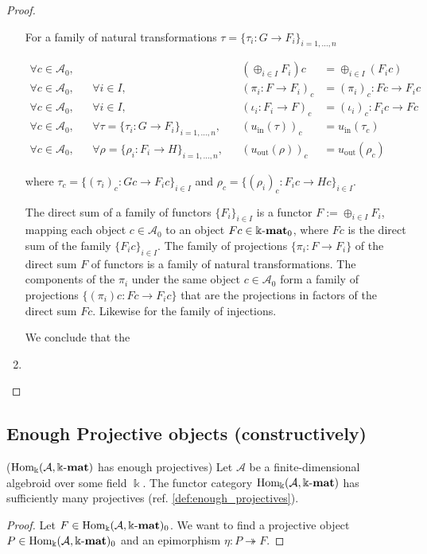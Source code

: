\begin{proof}
\begin{enumerate}
\begin{subproof}[Proof of (ii)]
For a family of natural transformations $\tau = \{ \tau_{i} : G \rightarrow F_{i} \}_{i = 1,\dots,n}$

\begin{align*}
\forall c \in \mathcal{A}_{0},&& &&  (\oplus_{i \in I} F_{i}) c &= \oplus_{i \in I} (F_{i} c) \\
\forall c \in \mathcal{A}_{0},&& \forall i \in I,&& (\pi_{i} : F \rightarrow F_{i})_{c} &= (\pi_{i})_{c} : Fc \rightarrow F_{i} c \\
\forall c \in \mathcal{A}_{0},&& \forall i \in I,&& (\iota_{i} : F_{i} \rightarrow F)_{c} &= (\iota_{i})_{c} : F_{i} c \rightarrow Fc \\
\forall c \in \mathcal{A}_{0},&& \forall \tau = \{ \tau_{i} : G \rightarrow F_{i} \}_{i = 1,\dots,n},&&
(u_{\mathrm{in}}(\tau))_{c} &= u_{\mathrm{in}}(\tau_{c}) \\
\forall c \in \mathcal{A}_{0},&& \forall \rho = \{ \rho_{i} : F_{i} \rightarrow H \}_{i = 1,\dots,n},&&
(u_{\mathrm{out}}(\rho))_{c} &= u_{\mathrm{out}}(\rho_{c})
\end{align*}

where $\tau_{c} = \{ (\tau_{i})_{c} : Gc \rightarrow F_{i} c \}_{i \in I}$ and $\rho_{c} = \{ (\rho_{i})_{c} : F_{i} c \rightarrow Hc \}_{i \in I}$.

The direct sum of a family of functors $\{ F_{i}\}_{i \in I}$ is a functor $F := \oplus_{i \in I} F_{i}$, mapping each object $c \in \mathcal{A}_{0}$
to an object $Fc \in \Bbbk\textnormal{-}\mathbf{mat}_{0}$, where $Fc$ is the direct sum of the family $\{ F_{i}c \}_{i \in I}$.
The family of projections $\{ \pi_{i} : F \rightarrow F_{i} \}$ of the direct sum $F$ of functors is a family of natural transformations.
The components of the $\pi_{i}$ under the same object $c \in \mathcal{A}_{0}$ form a family of projections $\{ (\pi_{i})c : Fc \rightarrow F_{i} c\}$
that are the projections in factors of the direct sum $Fc$. Likewise for the family of injections.

We conclude that the 
\end{subproof}

\item
\end{enumerate}
\end{proof}

\subsection{Enough Projective objects (constructively)}

\begin{theorem}{($\mathrm{Hom_{\Bbbk}}(\mathcal{A},\Bbbk\textnormal{-}\mathbf{mat})$ has enough projectives)}
Let $\mathcal{A}$ be a finite-dimensional algebroid over some field $\Bbbk$. The functor category $\mathrm{Hom_{\Bbbk}}(\mathcal{A},\Bbbk\textnormal{-}\mathbf{mat})$ has sufficiently many
projectives (ref. \ref{def:enough_projectives}).
\end{theorem}
\begin{proof}
Let $F \in \mathrm{Hom_{\Bbbk}}(\mathcal{A},\Bbbk\textnormal{-}\mathbf{mat})_{0}$. We want to find a projective object $P \in \mathrm{Hom_{\Bbbk}}(\mathcal{A},\Bbbk\textnormal{-}\mathbf{mat})_{0}$ and an epimorphism $\eta: P \twoheadrightarrow F$.






\end{proof}


